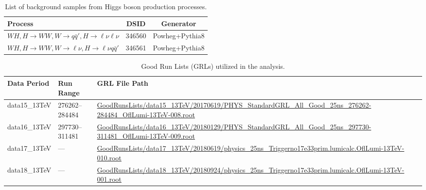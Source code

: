 \begin{table}[htbp]
\centering
\scriptsize
\begin{tabularx}{400pt}{|X||c|c|}
\hline
\centering \textbf{Process} & \textbf{DSID} & \textbf{Generator} \\
\hline
\centering $WH, H\rightarrow WW, W \to q\bar{q}', H \to \ell\nu\ell\nu$  & 346560 & Powheg+Pythia8 \\ \hline 
\centering $WH, H\rightarrow WW, W \to \ell\nu, H \to \ell\nu q\bar{q}'$  & 346561 & Powheg+Pythia8 \\ \hline 
\end{tabularx}
\caption{\rm List of background samples from Higgs boson production processes.}
\label{tab:Higgssamples}
\end{table}

\begin{table}[htbp]
\centering
\scriptsize
\begin{tabular}{@{}llp{8.5cm}@{}}
\toprule
\textbf{Data Period} & \textbf{Run Range} & \textbf{GRL File Path} \\
\midrule
data15\_13TeV & 276262--284484 & \url{GoodRunsLists/data15_13TeV/20170619/PHYS_StandardGRL_All_Good_25ns_276262-284484_OflLumi-13TeV-008.root} \\
\addlinespace 
data16\_13TeV & 297730--311481 & \url{GoodRunsLists/data16_13TeV/20180129/PHYS_StandardGRL_All_Good_25ns_297730-311481_OflLumi-13TeV-009.root} \\
\addlinespace
data17\_13TeV & ---            & \url{GoodRunsLists/data17_13TeV/20180619/physics_25ns_Triggerno17e33prim.lumicalc.OflLumi-13TeV-010.root} \\
\addlinespace
data18\_13TeV & ---            & \url{GoodRunsLists/data18_13TeV/20180924/physics_25ns_Triggerno17e33prim.lumicalc.OflLumi-13TeV-001.root} \\
\bottomrule
\end{tabular}
\caption{\rm Good Run Lists (GRLs) utilized in the analysis.}
\label{tab:grls_app}
\end{table}

